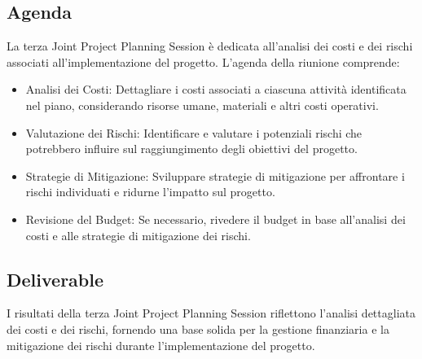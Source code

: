 \subsection{Agenda}

La terza Joint Project Planning Session è dedicata all'analisi dei costi e dei rischi associati all'implementazione del progetto. L'agenda della riunione comprende:

\begin{itemize}
    \item Analisi dei Costi: Dettagliare i costi associati a ciascuna attività identificata nel piano, considerando risorse umane, materiali e altri costi operativi.
    \item Valutazione dei Rischi: Identificare e valutare i potenziali rischi che potrebbero influire sul raggiungimento degli obiettivi del progetto.
    \item Strategie di Mitigazione: Sviluppare strategie di mitigazione per affrontare i rischi individuati e ridurne l'impatto sul progetto.
    \item Revisione del Budget: Se necessario, rivedere il budget in base all'analisi dei costi e alle strategie di mitigazione dei rischi.
\end{itemize}

\subsection{Deliverable}

I risultati della terza Joint Project Planning Session riflettono l'analisi dettagliata dei costi e dei rischi, fornendo una base solida per la gestione finanziaria e la mitigazione dei rischi durante l'implementazione del progetto.
